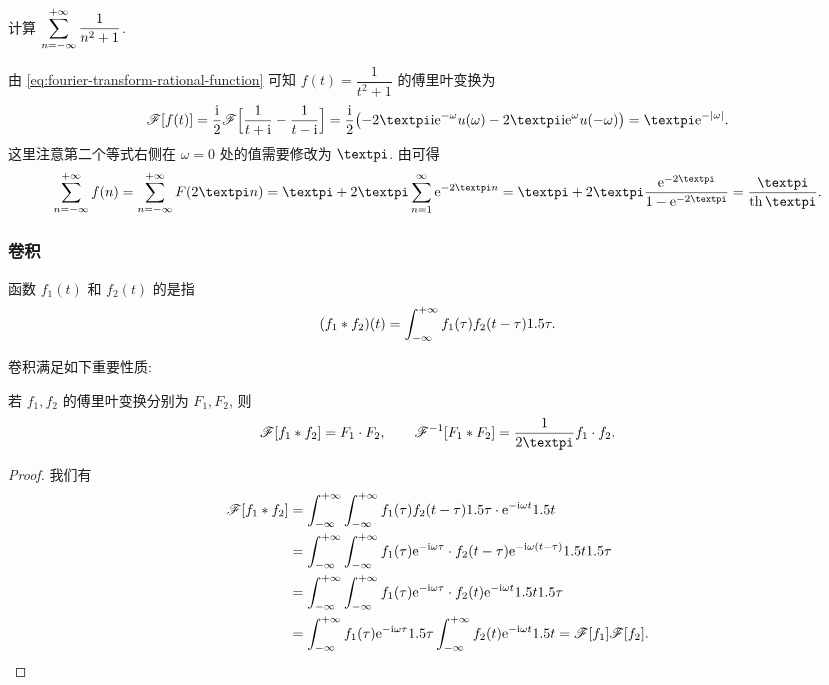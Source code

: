 \begin{example}
  计算 $\displaystyle\sum_{n=-\infty}^{+\infty} \dfrac1{n^2+1}$.
\end{example}

\begin{solution}
  由 \eqref{eq:fourier-transform-rational-function} 可知 $f(t)=\dfrac1{t^2+1}$ 的傅里叶变换为
  \begin{align*}
    \msf[f(t)]
    =\frac\ii2\msf\Bigl[\frac1{t+\ii}-\frac1{t-\ii}\Bigr]
    =\frac\ii2\bigl(-2\cpi\ii \ee^{-\omega} u(\omega)-2\cpi\ii \ee^{\omega} u(-\omega)\bigr)
    =\cpi \ee^{-\abs{\omega}}.
  \end{align*}
  这里注意第二个等式右侧在 $\omega=0$ 处的值需要修改为 $\cpi$.
  由\thmFPoi 可得
  \[
     \sumff f(n)
    =\sumff F(2\cpi n)
    =\cpi+2\cpi\sumf1 \ee^{-2\cpi n}
    =\cpi+2\cpi\frac{\ee^{-2\cpi}}{1-\ee^{-2\cpi}}
    =\frac\cpi{\tanh\cpi}.
  \]
\end{solution}


\subsubsection{卷积}

\begin{definition}
  函数 $f_1(t)$ 和 $f_2(t)$ 的是指
  \[
    (f_1\ast f_2)(t)=\displaystyle\int_{-\infty}^{+\infty} f_1(\tau)f_2(t-\tau)1.5 \tau.
  \]
\end{definition}

卷积满足如下重要性质:

\begin{theorem}[卷积定理]
  \label{thm:convolution-theorem}
  若 $f_1,f_2$ 的傅里叶变换分别为 $F_1,F_2$, 则
  \[
    \msf[f_1\ast f_2]=F_1\cdot F_2,\qquad
    \msf^{-1}[F_1\ast F_2]=\frac1{2\cpi}f_1\cdot f_2.
  \]
\end{theorem}

\begin{proof}
  我们有
  \begin{align*}
    \mathscr{F}[f_1\ast f_2]&=\displaystyle\int_{-\infty}^{+\infty} \displaystyle\int_{-\infty}^{+\infty} f_1(\tau)f_2(t-\tau)1.5 \tau \cdot \mathrm{e}^{-\mathrm{i} \omega t}1.5 t\\
    &=\displaystyle\int_{-\infty}^{+\infty} \displaystyle\int_{-\infty}^{+\infty} f_1(\tau)\mathrm{e}^{-\mathrm{i} \omega \tau}\cdot f_2(t-\tau)\mathrm{e}^{-\mathrm{i} \omega (t-\tau)}1.5 t1.5 \tau\\
    &=\displaystyle\int_{-\infty}^{+\infty} \displaystyle\int_{-\infty}^{+\infty} f_1(\tau)\mathrm{e}^{-\mathrm{i} \omega \tau}\cdot f_2(t)\mathrm{e}^{-\mathrm{i} \omega t}1.5 t1.5 \tau\\
    &=\displaystyle\int_{-\infty}^{+\infty} f_1(\tau)\mathrm{e}^{-\mathrm{i} \omega \tau}1.5\tau\displaystyle\int_{-\infty}^{+\infty} f_2(t)\mathrm{e}^{-\mathrm{i} \omega t}1.5 t
    =\mathscr{F}[f_1]\mathscr{F}[f_2].
  \end{align*}
\end{proof}

